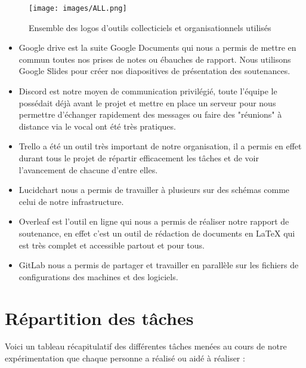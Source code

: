 \documentclass[oneside,12pt]{report}
\begin{document}
\begin{figure}[!ht]
    \centering
    \texttt{[image: images/ALL.png]}
    \caption{Ensemble des logos d'outils collecticiels et organisationnels utilisés}
    \label{fig:mesh1}
\end{figure}


\begin{itemize}

    \item Google drive est la suite Google Documents qui nous a permis de mettre en commun toutes nos prises de notes ou ébauches de rapport. Nous utilisons Google Slides pour créer nos diapositives de présentation des soutenances.
    
    \item Discord est notre moyen de communication privilégié, toute l'équipe le possédait déjà avant le projet et mettre en place un serveur pour nous permettre d'échanger rapidement des messages ou faire des "réunions" à distance via le vocal ont été très pratiques.
    
    \item Trello a été un outil très important de notre organisation, il a permis en effet durant tous le projet de répartir efficacement les tâches et de voir l'avancement de chacune d'entre elles.
    
    \item Lucidchart nous a permis de travailler à plusieurs sur des schémas comme celui de notre infrastructure.
    
    \item Overleaf est l'outil en ligne qui nous a permis de réaliser notre rapport de soutenance, en effet c'est un outil de rédaction de documents en LaTeX qui est très complet et accessible partout et pour tous. 
    
    \item GitLab nous a permis de partager et travailler en parallèle sur les fichiers de configurations des machines et des logiciels.
    
\end{itemize}

\section{Répartition des tâches}

Voici un tableau récapitulatif des différentes tâches menées au cours de notre expérimentation que chaque personne a réalisé ou aidé à réaliser :\newline
\end{document}
